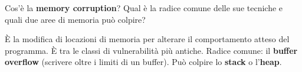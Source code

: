 \question[4]
Cos'è la \textbf{memory corruption}? Qual è la radice comune delle sue tecniche e quali due aree di memoria può colpire?
\begin{solution}
È la modifica di locazioni di memoria per alterare il comportamento atteso del programma. È tra le classi di vulnerabilità più antiche.
Radice comune: il \textbf{buffer overflow} (scrivere oltre i limiti di un buffer). Può colpire lo \textbf{stack} o l'\textbf{heap}.
\end{solution}
